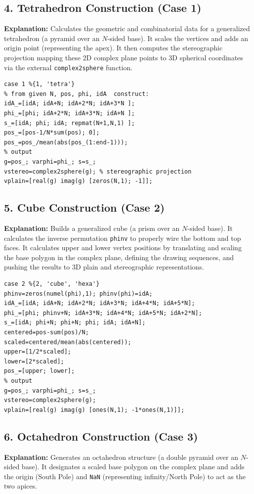 \subsection{4. Tetrahedron Construction (Case 1)}
\textbf{Explanation:} 
Calculates the geometric and combinatorial data for a generalized tetrahedron (a pyramid over an $N$-sided base). It scales the vertices and adds an origin point (representing the apex). It then computes the stereographic projection mapping these 2D complex plane points to 3D spherical coordinates via the external \texttt{complex2sphere} function.

\begin{lstlisting}
case 1 %{1, 'tetra'}
% from given N, pos, phi, idA  construct:
idA_=[idA; idA+N; idA+2*N; idA+3*N ];
phi_=[phi; idA+2*N; idA+3*N; idA+N ];
s_=[idA; phi; idA; repmat(N+1,N,1) ];
pos_=[pos-1/N*sum(pos); 0];
pos_=pos_/mean(abs(pos_(1:end-1)));
% output
g=pos_; varphi=phi_; s=s_;
vstereo=complex2sphere(g); % stereographic projection
vplain=[real(g) imag(g) [zeros(N,1); -1]];
\end{lstlisting}

\subsection{5. Cube Construction (Case 2)}
\textbf{Explanation:} 
Builds a generalized cube (a prism over an $N$-sided base). It calculates the inverse permutation \texttt{phinv} to properly wire the bottom and top faces. It calculates upper and lower vertex positions by translating and scaling the base polygon in the complex plane, defining the drawing sequences, and pushing the results to 3D plain and stereographic representations.

\begin{lstlisting}
case 2 %{2, 'cube', 'hexa'}
phinv=zeros(numel(phi),1); phinv(phi)=idA;
idA_=[idA; idA+N; idA+2*N; idA+3*N; idA+4*N; idA+5*N];
phi_=[phi; phinv+N; idA+3*N; idA+4*N; idA+5*N; idA+2*N];
s_=[idA; phi+N; phi+N; phi; idA; idA+N];
centered=pos-sum(pos)/N;
scaled=centered/mean(abs(centered));
upper=[1/2*scaled];
lower=[2*scaled];
pos_=[upper; lower];
% output
g=pos_; varphi=phi_; s=s_;
vstereo=complex2sphere(g); 
vplain=[real(g) imag(g) [ones(N,1); -1*ones(N,1)]];
\end{lstlisting}

\subsection{6. Octahedron Construction (Case 3)}
\textbf{Explanation:} 
Generates an octahedron structure (a double pyramid over an $N$-sided base). It designates a scaled base polygon on the complex plane and adds the origin (South Pole) and \texttt{NaN} (representing infinity/North Pole) to act as the two apices. 

